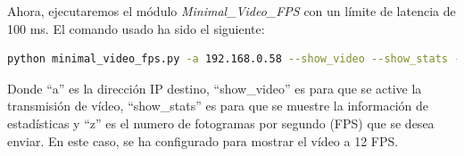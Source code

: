 \newpage

Ahora, ejecutaremos el módulo \textit{Minimal\_Video\_FPS} con un límite de latencia de 100 ms. El comando usado ha sido el siguiente:

\begin{lstlisting}[language=bash, basicstyle=\ttfamily\scriptsize]
    python minimal_video_fps.py -a 192.168.0.58 --show_video --show_stats -z 12
\end{lstlisting}
Donde ``a'' es la dirección IP destino, ``show\_video'' es para que se active la transmisión de vídeo, ``show\_stats'' es para que se muestre la información de estadísticas y ``z'' es el numero de fotogramas por segundo (FPS) que se desea enviar. En este caso, se ha configurado para mostrar el vídeo a 12 FPS.
\vspace{\baselineskip}

